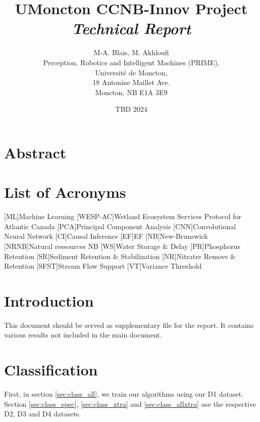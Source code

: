 \documentclass[12pt,letterpaper]{article}
\title{\textbf{UMoncton CCNB-Innov Project} 
\textit{Technical Report}}
\author{M-A. Blais, M. Akhloufi \\
Perception, Robotics and Intelligent Machines (PRIME), \\
Université de Moncton, \\
18 Antonine Maillet Ave. \\
Moncton, NB E1A 3E9}
\date{TBD 2024}
\begin{document}
\maketitle
\thispagestyle{empty}



\clearpage 
\thispagestyle{plain}
\tableofcontents %

\section*{Abstract}

\clearpage
\printglossaries

\clearpage
\section*{List of Acronyms}
\begin{acronym}
[ML]{Machine Learning}
[WESP-AC]{Wetland Ecosystem Services Protocol for Atlantic Canada}
[PCA]{Principal Component Analysis}
[CNN]{Convolutional Neural Network}
[CI]{Causal Inference}
[EF]{\ac{EF}}
[NB]{New-Brunswick}
[NRNB]{Natural ressources NB}
[WS]{Water Storage \& Delay}
[PR]{Phosphorus Retention}
[SR]{Sediment Retention \& Stabilization}
[NR]{Nitratre Remove \& Retention}
[SFST]{Stream Flow Support}
[VT]{Variance Threshold}


\end{acronym}



\section{Introduction}
This document should be served as supplementary file for the report.
It contains various results not included in the main document.


\section{Classification}\label{sec:class}
First, in section \ref{sec:class_all}, we train our algorithms using our D1 dataset.
Section \ref{sec:class_spec}, \ref{sec:class_xtra} and \ref{sec:class_allxtra} use the respective D2, D3 and D4 datasets.
\end{document}
